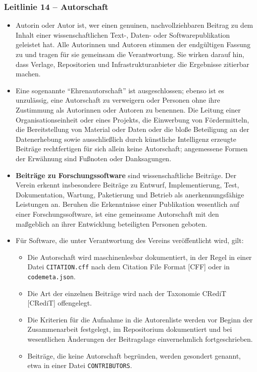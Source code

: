 \documentclass[a4paper, fontsize=11pt]{scrartcl}
\begin{document}
\subsubsection*{Leitlinie 14 -- Autorschaft}
\begin{itemize}
  \item Autorin oder Autor ist, wer einen genuinen, nachvollziehbaren Beitrag zu dem Inhalt einer wissenschaftlichen Text-, Daten- oder Softwarepublikation geleistet hat. Alle Autorinnen und Autoren stimmen der endgültigen Fassung zu und tragen für sie gemeinsam die Verantwortung. Sie wirken darauf hin, dass Verlage, Repositorien und Infrastrukturanbieter die Ergebnisse zitierbar machen.
  \item Eine sogenannte \enquote{Ehrenautorschaft} ist ausgeschlossen; ebenso ist es unzulässig, eine Autorschaft zu verweigern oder Personen ohne ihre Zustimmung als Autorinnen oder Autoren zu benennen. Die Leitung einer Organisationseinheit oder eines Projekts, die Einwerbung von Fördermitteln, die Bereitstellung von Material oder Daten oder die bloße Beteiligung an der Datenerhebung sowie ausschließlich durch künstliche Intelligenz erzeugte Beiträge rechtfertigen für sich allein keine Autorschaft; angemessene Formen der Erwähnung sind Fußnoten oder Danksagungen.
  \item \textbf{Beiträge zu Forschungssoftware} sind wissenschaftliche Beiträge. Der Verein erkennt insbesondere Beiträge zu Entwurf, Implementierung, Test, Dokumentation, Wartung, Paketierung und Betrieb als anerkennungsfähige Leistungen an. Beruhen die Erkenntnisse einer Publikation wesentlich auf einer Forschungssoftware, ist eine gemeinsame Autorschaft mit den maßgeblich an ihrer Entwicklung beteiligten Personen geboten.
  \item Für Software, die unter Verantwortung des Vereins veröffentlicht wird, gilt:
  \begin{itemize}
    \item Die Autorschaft wird maschinenlesbar dokumentiert, in der Regel in einer Datei \texttt{CITATION.cff} nach dem Citation File Format [CFF] oder in \texttt{codemeta.json}.
    \item Die Art der einzelnen Beiträge wird nach der Taxonomie CRediT [CRediT] offengelegt.
    \item Die Kriterien für die Aufnahme in die Autorenliste werden vor Beginn der Zusammenarbeit festgelegt, im Repositorium dokumentiert und bei wesentlichen Änderungen der Beitragslage einvernehmlich fortgeschrieben.
    \item Beiträge, die keine Autorschaft begründen, werden gesondert genannt, etwa in einer Datei \texttt{CONTRIBUTORS}.

\end{itemize}
\end{itemize}
\end{document}
